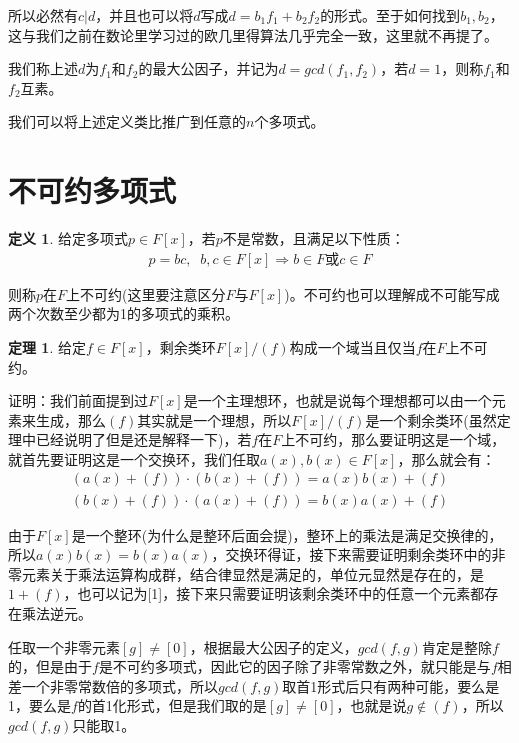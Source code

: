 \documentclass[12pt, a4paper, oneside]{ctexart}
\theoremstyle{definition}
\newtheorem*{definition}{定义}
\newtheorem*{theorem}{定理}
\begin{document}
所以必然有$c|d$，并且也可以将$d$写成$d=b_1f_1+b_2f_2$的形式。至于如何找到$b_1,b_2$，这与我们之前在数论里学习过的欧几里得算法几乎完全一致，这里就不再提了。

我们称上述$d$为$f_1$和$f_2$的最大公因子，并记为$d=gcd(f_1,f_2)$，若$d=1$，则称$f_1$和$f_2$互素。

我们可以将上述定义类比推广到任意的$n$个多项式。

\section*{不可约多项式}

\begin{definition}
给定多项式$p\in F[x]$，若$p$不是常数，且满足以下性质：
\begin{align*}
p=bc,\;\;b,c\in F[x]\Rightarrow b\in F\mbox{或}c\in F
\end{align*}

则称$p$在$F$上不可约(这里要注意区分$F$与$F[x]$)。不可约也可以理解成不可能写成两个次数至少都为1的多项式的乘积。
\end{definition}

\begin{theorem}
给定$f\in F[x]$，剩余类环$F[x]/(f)$构成一个域当且仅当$f$在$F$上不可约。
\end{theorem}

证明：我们前面提到过$F[x]$是一个主理想环，也就是说每个理想都可以由一个元素来生成，那么$(f)$其实就是一个理想，所以$F[x]/(f)$是一个剩余类环(虽然定理中已经说明了但是还是解释一下)，若$f$在$F$上不可约，那么要证明这是一个域，就首先要证明这是一个交换环，我们任取$a(x),b(x)\in F[x]$，那么就会有：
\begin{align*}
(a(x)+(f))\cdot(b(x)+(f))=a(x)b(x)+(f)\\
(b(x)+(f))\cdot(a(x)+(f))=b(x)a(x)+(f)
\end{align*}

由于$F[x]$是一个整环(为什么是整环后面会提)，整环上的乘法是满足交换律的，所以$a(x)b(x)=b(x)a(x)$，交换环得证，接下来需要证明剩余类环中的非零元素关于乘法运算构成群，结合律显然是满足的，单位元显然是存在的，是$1+(f)$，也可以记为[1]，接下来只需要证明该剩余类环中的任意一个元素都存在乘法逆元。

任取一个非零元素$[g]\neq [0]$，根据最大公因子的定义，$gcd(f,g)$肯定是整除$f$的，但是由于$f$是不可约多项式，因此它的因子除了非零常数之外，就只能是与$f$相差一个非零常数倍的多项式，所以$gcd(f,g)$取首1形式后只有两种可能，要么是1，要么是$f$的首1化形式，但是我们取的是$[g]\neq [0]$，也就是说$g\notin (f)$，所以$gcd(f,g)$只能取1。
\end{document}
